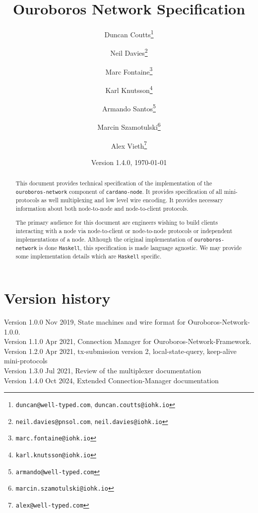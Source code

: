 \documentclass{report}
\begin{document}
\title{Ouroboros Network Specification}
\author{
  Duncan Coutts\footnote{\small \texttt{duncan@well-typed.com}, {\small \texttt{duncan.coutts@iohk.io}}}
\and
  Neil Davies\footnote{{\small \texttt{neil.davies@pnsol.com}}, {\small \texttt{neil.davies@iohk.io}}}
\and
  Marc Fontaine\footnote{{\small \texttt{marc.fontaine@iohk.io}}}
\and
  Karl Knutsson\footnote{{\small \texttt{karl.knutsson@iohk.io}}}
\and
  Armando Santos\footnote{{\small \texttt{armando@well-typed.com}}}
\and
  Marcin Szamotulski\footnote{{\small \texttt{marcin.szamotulski@iohk.io}}}
\and
  Alex Vieth\footnote{{\small \texttt{alex@well-typed.com}}}
}
\date{{\small Version 1.4.0, \today}}

\maketitle

\begin{abstract}
  This document provides technical specification of the implementation of the
  \texttt{ouroboros-network} component of \texttt{cardano-node}. It provides specification of all
  mini-protocols as well multiplexing and low level wire encoding.  It provides
  necessary information about both node-to-node and node-to-client protocols.

  The primary audience for this document are engineers wishing to build
  clients interacting with a node via node-to-client or node-to-node protocols
  or independent implementations of a node.  Although the original
  implementation of \texttt{ouroboros-network} is done \texttt{Haskell}, this specification is
  made language agnostic. We may provide some implementation details which are
  \texttt{Haskell} specific.
\end{abstract}

\tableofcontents

\section*{Version history}

\begin{description}
\item[Version 1.0.0 Nov 2019, State machines and wire format for Ouroboros-Network-1.0.0.]
\item[Version 1.1.0 Apr 2021, Connection Manager for Ouroboros-Network-Framework.]
\item[Version 1.2.0 Apr 2021, tx-submission version 2, local-state-query, keep-alive mini-protocols]
\item[Version 1.3.0 Jul 2021, Review of the multiplexer documentation]
\item[Version 1.4.0 Oct 2024, Extended Connection-Manager documentation]
\end{description}
\listoftodos
% 




% 
\end{document}
